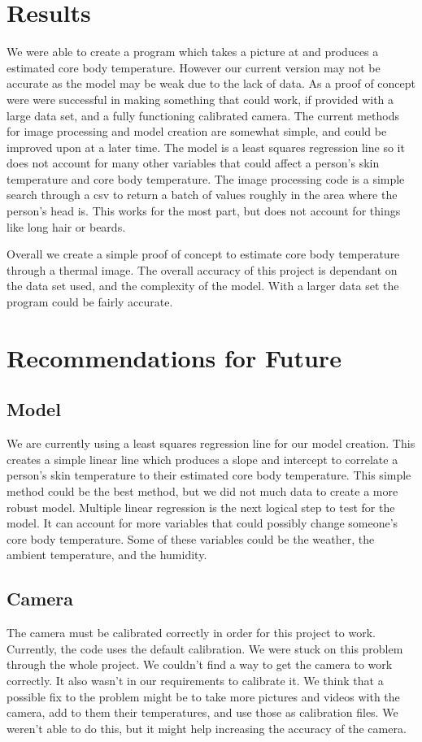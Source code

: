 \section*{Results}
	We were able to create a program which takes a picture at and produces a estimated core body temperature. However our current version may not be accurate as the model may be weak due to the lack of data. As a proof of concept were were successful in making something that could work, if provided with a large data set, and a fully functioning calibrated camera. The current methods for image processing and model creation are somewhat simple, and could be improved upon at a later time. The model is a least squares regression line so it does not account for many other variables that could affect a person’s skin temperature and core body temperature. The image processing code is a simple search through a csv to return a batch of values roughly in the area where the person’s head is. This works for the most part, but does not account for things like long hair or beards.
	
	Overall we create a simple proof of concept to estimate core body temperature through a thermal image. The overall accuracy of this project is dependant on the data set used, and the complexity of the model. With a larger data set the program could be fairly accurate.
	
\section*{Recommendations for Future}
\subsection*{Model}
We are currently using a least squares regression line for our model creation. This creates a simple linear line which produces a slope and intercept to correlate a person’s skin temperature to their estimated core body temperature. This simple method could be the best method, but we did not much data to create a more robust model.
Multiple linear regression is the next logical step to test for the model. It can account for more variables that could possibly change someone’s core body temperature. Some of these variables could be the weather, the ambient temperature, and the humidity.


\subsection*{Camera}
The camera must be calibrated correctly in order for this project to work. Currently, the code uses the default calibration. We were stuck on this problem through the whole project. We couldn't find a way to get the camera to work correctly. It also wasn't in our requirements to calibrate it. We think that a possible fix to the problem might be to take more pictures and videos with the camera, add to them their temperatures, and use those as calibration files. We weren't able to do this, but it might help increasing the accuracy of the camera.


